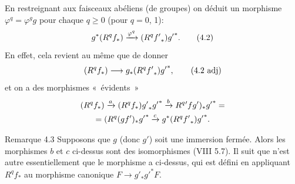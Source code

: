 \documentclass[10pt]{../fichiers-configuration-latex/smfart}
\begin{document}
En restreignant  aux faisceaux abéliens (\resp de groupes) on
déduit un morphisme $\varphi^q=\varphi^g g$ pour chaque $q\geq 0$
(\resp pour $q=0$, 1):
\begin{equation*}
g^{\ast}(R^qf_{\ast})\xrightarrow{\varphi^q}(R^q{f'}_{\ast}){g'}^{\ast}{}.
\tag{4.2}
\end{equation*}
En effet, cela revient au même que de donner
\begin{equation*}
(R^qf_{\ast})\longrightarrow
  g_{\ast}(R^q{f'}_{\ast}){g'}^{\ast}{},\tag{4.2 adj}
\end{equation*}\label{4.2 adj}
et on a des morphismes « évidents » 
\begin{gather*}
(R^qf_{\ast})\xrightarrow{a}
  (R^qf_{\ast}){g'}_{\ast}{g'}^{\ast}\xrightarrow{b}
  R^q{'}fg')_{\ast}{g'}^{\ast}=\\
=(R^q(gf')_{\ast}{g'}^{\ast}\xrightarrow{c}
  g^{\ast}(R^q{f'}_{\ast}){g'}^{\ast}{}.
\end{gather*}

\begin{enonce*}[remark]{Remarque 4.3}
Supposons que $g$ (donc $g'$) soit une immersion fermée. Alors les
morphismes $b$ et $c$ ci-dessus sont des isomorphismes (VIII 5.7). Il
suit que  n'est autre essentiellement que le morphisme a
ci-dessus, qui est défini en appliquant $R^qf_{\ast}$ au morphisme
canonique $F\rightarrow {g'}_{\ast}{g'}^{\ast}F$.
\end{enonce*}
\end{document}
